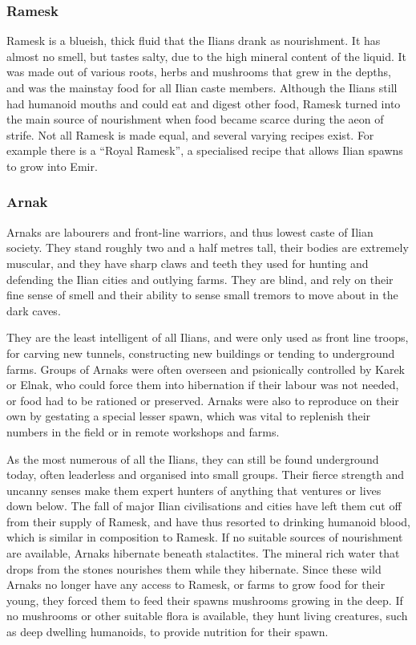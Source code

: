 \subsubsection{Ramesk}
\label{sec:Ramesk}

Ramesk is a blueish, thick fluid that the Ilians drank as nourishment. It has
almost no smell, but tastes salty, due to the high mineral content of the
liquid. It was made out of various roots, herbs and mushrooms that grew in the
depths, and was the mainstay food for all Ilian caste members. Although the
Ilians still had humanoid mouths and could eat and digest other food, Ramesk
turned into the main source of nourishment when food became scarce during the
aeon of strife. Not all Ramesk is made equal, and several varying recipes
exist. For example there is a ``Royal Ramesk'', a specialised recipe that
allows Ilian spawns to grow into Emir.

\subsubsection{Arnak}
\label{sec:Arnak}

Arnaks are labourers and front-line warriors, and thus lowest caste of Ilian
society. They stand roughly two and a half metres tall, their bodies are
extremely muscular, and they have sharp claws and teeth they used for hunting
and defending the Ilian cities and outlying farms. They are blind, and rely on
their fine sense of smell and their ability to sense small tremors to move
about in the dark caves.

They are the least intelligent of all Ilians, and were only used as front line
troops, for carving new tunnels, constructing new buildings or tending to
underground farms. Groups of Arnaks were often overseen and psionically
controlled by Karek or Elnak, who could force them into hibernation if their
labour was not needed, or food had to be rationed or preserved. Arnaks were
also to reproduce on their own by gestating a special lesser spawn, which was
vital to replenish their numbers in the field or in remote workshops and
farms.

As the most numerous of all the Ilians, they can still be found underground
today, often leaderless and organised into small groups. Their fierce strength
and uncanny senses make them expert hunters of anything that ventures or lives
down below. The fall of major Ilian civilisations and cities have left them
cut off from their supply of Ramesk, and have thus resorted to drinking
humanoid blood, which is similar in composition to Ramesk. If no suitable
sources of nourishment are available, Arnaks hibernate beneath
stalactites. The mineral rich water that drops from the stones nourishes them
while they hibernate. Since these wild Arnaks no longer have any access to
Ramesk, or farms to grow food for their young, they forced them to feed their
spawns mushrooms growing in the deep. If no mushrooms or other suitable flora
is available, they hunt living creatures, such as deep dwelling humanoids, to
provide nutrition for their spawn.

